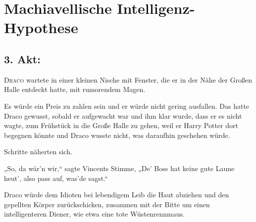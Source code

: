 \chapter{Machiavellische Intelligenz-Hypothese}


\section{3. Akt:}

\lettrine{D}{raco} wartete in einer kleinen Nische mit Fenster, die er in der Nähe der Großen Halle entdeckt hatte, mit rumorendem Magen.

Es würde ein Preis zu zahlen sein und er würde nicht gering ausfallen. Das hatte Draco gewusst, sobald er aufgewacht war und ihm klar wurde, dass er es nicht wagte, zum Frühstück in die Große Halle zu gehen, weil er Harry Potter dort begegnen könnte und Draco wusste nicht, was daraufhin geschehen würde.

Schritte näherten sich.

„So, da wär'n wir,“ sagte Vincents Stimme, „De' Boss hat keine gute Laune heut', also pass auf, was'de sagst.“

Draco würde dem Idioten bei lebendigem Leib die Haut abziehen und den gepellten Körper zurückschicken, zusammen mit der Bitte um einen intelligenteren Diener, wie etwa eine tote Wüstenrennmaus.


